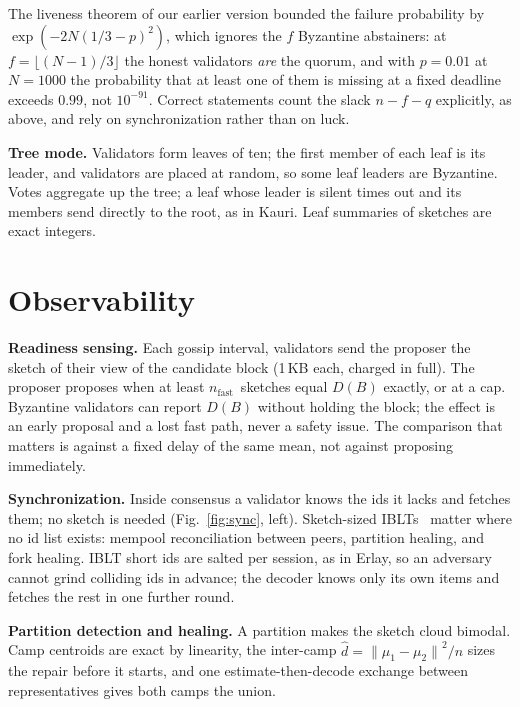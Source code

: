 \documentclass[journal]{IEEEtran}
\newcommand{\norm}[1]{\ensuremath{\lVert #1 \rVert}}
\newcommand{\nf}{\ensuremath{n_{\mathrm{fast}}}}
\begin{document}
The liveness theorem of our earlier version bounded the failure
probability by $\exp(-2N(1/3 - p)^{2})$, which ignores the $f$ Byzantine
abstainers: at $f = \lfloor (N-1)/3 \rfloor$ the honest validators
\emph{are} the quorum, and with $p = 0.01$ at $N = 1000$ the probability
that at least one of them is missing at a fixed deadline exceeds $0.99$,
not $10^{-91}$. Correct statements count the slack $n - f - q$ explicitly,
as above, and rely on synchronization rather than on luck.

\textbf{Tree mode.} Validators form leaves of ten; the first member of
each leaf is its leader, and validators are placed at random, so some
leaf leaders are Byzantine. Votes aggregate up the tree; a leaf whose
leader is silent times out and its members send directly to the root, as
in Kauri. Leaf summaries of sketches are exact integers.

\section{Observability}
\label{sec:observe}

\textbf{Readiness sensing.} Each gossip interval, validators send the
proposer the sketch of their view of the candidate block (1\,KB each,
charged in full). The proposer proposes when at least \nf\ sketches equal
$D(B)$ exactly, or at a cap. Byzantine validators can report $D(B)$
without holding the block; the effect is an early proposal and a lost
fast path, never a safety issue. The comparison that matters is against
a fixed delay of the same mean, not against proposing immediately.

\textbf{Synchronization.} Inside consensus a validator knows the ids it
lacks and fetches them; no sketch is needed (Fig.~\ref{fig:sync}, left).
Sketch-sized IBLTs~\cite{goodrich2011iblt} matter where no id list exists:
mempool reconciliation between peers, partition healing, and fork
healing. IBLT short ids are salted per session, as in Erlay, so an
adversary cannot grind colliding ids in advance; the decoder knows only
its own items and fetches the rest in one further round.

\textbf{Partition detection and healing.} A partition makes the sketch
cloud bimodal. Camp centroids are exact by linearity, the inter-camp
$\hat d = \norm{\mu_{1} - \mu_{2}}^{2}/n$ sizes the repair before it
starts, and one estimate-then-decode exchange between representatives
gives both camps the union.
\end{document}
